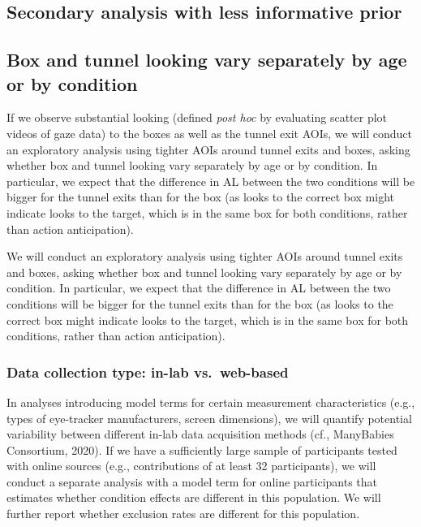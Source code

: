 \documentclass[
  man, donotrepeattitle,floatsintext]{apa6}
\begin{document}
\subsection{Secondary analysis with less informative prior}\label{secondary-analysis-with-less-informative-prior}

\subsection{Box and tunnel looking vary separately by age or by condition}\label{box-and-tunnel-looking-vary-separately-by-age-or-by-condition}

If we observe substantial looking (defined \emph{post hoc} by evaluating scatter plot videos of gaze data) to the boxes as well as the tunnel exit AOIs, we will conduct an exploratory analysis using tighter AOIs around tunnel exits and boxes, asking whether box and tunnel looking vary separately by age or by condition. In particular, we expect that the difference in AL between the two conditions will be bigger for the tunnel exits than for the box (as looks to the correct box might indicate looks to the target, which is in the same box for both conditions, rather than action anticipation).

We will conduct an exploratory analysis using tighter AOIs around tunnel exits and boxes, asking whether box and tunnel looking vary separately by age or by condition. In particular, we expect that the difference in AL between the two conditions will be bigger for the tunnel exits than for the box (as looks to the correct box might indicate looks to the target, which is in the same box for both conditions, rather than action anticipation).

\subsubsection{Data collection type: in-lab vs.~web-based}\label{data-collection-type-in-lab-vs.-web-based}

In analyses introducing model terms for certain measurement characteristics (e.g., types of eye-tracker manufacturers, screen dimensions), we will quantify potential variability between different in-lab data acquisition methods (cf., ManyBabies Consortium, 2020). If we have a sufficiently large sample of participants tested with online sources (e.g., contributions of at least 32 participants), we will conduct a separate analysis with a model term for online participants that estimates whether condition effects are different in this population. We will further report whether exclusion rates are different for this population.
\end{document}
